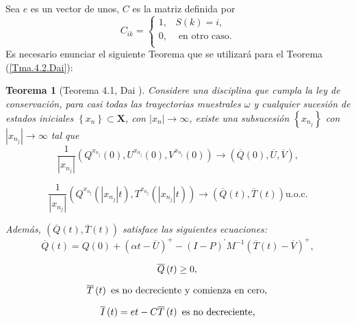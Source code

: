 \documentclass{article}
\newtheorem{Teo}{Teorema}
\begin{document}
Sea $e$ es un vector de unos, $C$ es la matriz definida por
\[C_{ik}=\left\{\begin{array}{cc}
1,& S\left(k\right)=i,\\
0,& \textrm{ en otro caso}.\\
\end{array}\right.
\]
Es necesario enunciar el siguiente Teorema que se utilizar\'a para
el Teorema (\ref{Tma.4.2.Dai}):
\begin{Teo}[Teorema 4.1, Dai \cite{Dai}]
Considere una disciplina que cumpla la ley de conservaci\'on, para
casi todas las trayectorias muestrales $\omega$ y cualquier
sucesi\'on de estados iniciales $\left\{x_{n}\right\}\subset
\mathbf{X}$, con $|x_{n}|\rightarrow\infty$, existe una
subsucesi\'on $\left\{x_{n_{j}}\right\}$ con
$|x_{n_{j}}|\rightarrow\infty$ tal que
\begin{equation}\label{Eq.4.15}
\frac{1}{|x_{n_{j}}|}\left(Q^{x_{n_{j}}}\left(0\right),U^{x_{n_{j}}}\left(0\right),V^{x_{n_{j}}}\left(0\right)\right)\rightarrow\left(\overline{Q}\left(0\right),\overline{U},\overline{V}\right),
\end{equation}

\begin{equation}\label{Eq.4.16}
\frac{1}{|x_{n_{j}}|}\left(Q^{x_{n_{j}}}\left(|x_{n_{j}}|t\right),T^{x_{n_{j}}}\left(|x_{n_{j}}|t\right)\right)\rightarrow\left(\overline{Q}\left(t\right),\overline{T}\left(t\right)\right)\textrm{
u.o.c.}
\end{equation}

Adem\'as,
$\left(\overline{Q}\left(t\right),\overline{T}\left(t\right)\right)$
satisface las siguientes ecuaciones:
\begin{equation}\label{Eq.MF.1.3a}
\overline{Q}\left(t\right)=Q\left(0\right)+\left(\alpha
t-\overline{U}\right)^{+}-\left(I-P\right)^{'}M^{-1}\left(\overline{T}\left(t\right)-\overline{V}\right)^{+},
\end{equation}

\begin{equation}\label{Eq.MF.2.3a}
\overline{Q}\left(t\right)\geq0,\\
\end{equation}

\begin{equation}\label{Eq.MF.3.3a}
\overline{T}\left(t\right)\textrm{ es no decreciente y comienza en cero},\\
\end{equation}

\begin{equation}\label{Eq.MF.4.3a}
\overline{I}\left(t\right)=et-C\overline{T}\left(t\right)\textrm{
es no decreciente,}\\
\end{equation}


\end{Teo}
\end{document}
